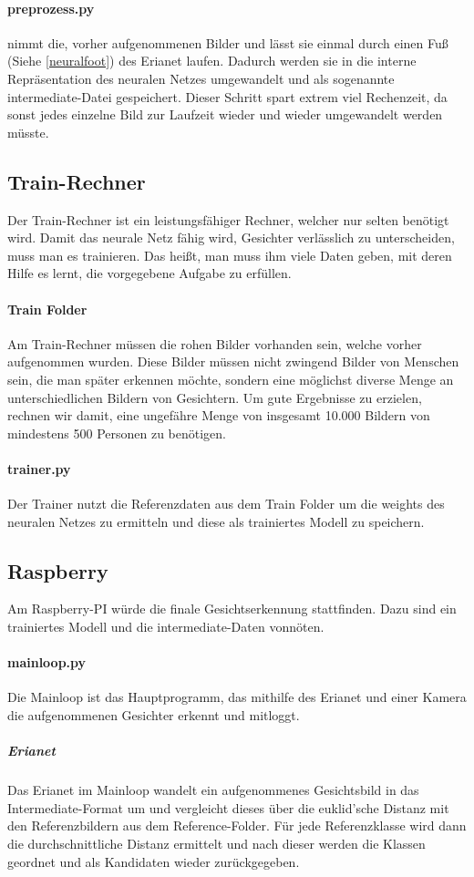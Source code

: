 \documentclass[12pt]{article}
\begin{document}
\paragraph{preprozess.py}
nimmt die, vorher aufgenommenen Bilder und lässt sie einmal 
durch einen Fuß (Siehe \ref{neuralfoot}) des Erianet laufen. Dadurch
werden sie in die interne Repräsentation des neuralen Netzes 
umgewandelt und als sogenannte intermediate-Datei gespeichert.
Dieser Schritt spart extrem viel Rechenzeit, da sonst
jedes einzelne Bild zur Laufzeit wieder und wieder 
umgewandelt werden müsste.
\subsection{Train-Rechner}
Der Train-Rechner ist ein leistungsfähiger Rechner, welcher nur selten
benötigt wird. Damit das neurale Netz fähig wird, Gesichter verlässlich
zu unterscheiden, muss man es trainieren. Das heißt, man muss ihm viele
Daten geben, mit deren Hilfe es lernt, die vorgegebene Aufgabe zu erfüllen.
\paragraph{Train Folder} Am Train-Rechner müssen die rohen
Bilder vorhanden sein, welche vorher aufgenommen wurden.
Diese Bilder müssen nicht zwingend Bilder von Menschen sein,
die man später erkennen möchte, sondern eine möglichst diverse
Menge an unterschiedlichen Bildern von Gesichtern. Um gute Ergebnisse
zu erzielen, rechnen wir damit, eine ungefähre Menge von insgesamt
10.000 Bildern von mindestens 500 Personen zu benötigen.
\paragraph{trainer.py}
Der Trainer nutzt die Referenzdaten aus dem Train Folder 
um die weights des neuralen Netzes zu ermitteln und diese
als trainiertes Modell zu speichern.
\subsection{Raspberry}
Am Raspberry-PI würde die finale Gesichtserkennung stattfinden.
Dazu sind ein trainiertes Modell und die intermediate-Daten vonnöten.
\paragraph{mainloop.py}
Die Mainloop ist das Hauptprogramm, das mithilfe des Erianet und einer Kamera
die aufgenommenen Gesichter erkennt und mitloggt.
\subparagraph{Erianet}
Das Erianet im Mainloop wandelt ein aufgenommenes Gesichtsbild in
das Intermediate-Format um und vergleicht dieses über die 
euklid'sche Distanz mit den Referenzbildern aus dem Reference-Folder.
Für jede Referenzklasse wird dann die durchschnittliche Distanz
ermittelt und nach dieser werden die Klassen geordnet und als
Kandidaten wieder zurückgegeben.
\end{document}
